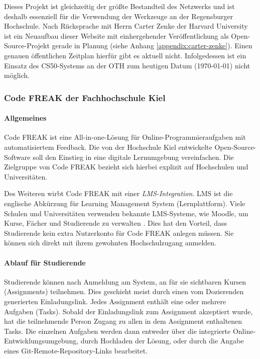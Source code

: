 Dieses Projekt ist gleichzeitig der größte Bestandteil des Netzwerks und ist
deshalb essenziell für die Verwendung der Werkzeuge an der Regensburger
Hochschule. Nach Rücksprache mit Herrn Carter Zenke der Harvard University ist
ein Neuaufbau dieser Website mit einhergehender Veröffentlichung als
Open-Source-Projekt gerade in Planung (siehe Anhang
\ref{appendix:carter-zenke}). Einen genauen öffentlichen Zeitplan hierfür gibt
es aktuell nicht. Infolgedessen ist ein Einsatz des CS50-Systems an der OTH zum
heutigen Datum (\today) nicht möglich.

\newpage
\subsubsection{Code FREAK der Fachhochschule Kiel}\label{code-freak}
\paragraph{Allgemeines}
Code FREAK ist eine All-in-one-Lösung für Online-Programmieraufgaben mit
automatisiertem Feedback. Die von der Hochschule Kiel entwickelte
Open-Source-Software soll den Einstieg in eine digitale Lernumgebung
vereinfachen. Die Zielgruppe von Code FREAK bezieht sich hierbei explizit auf
Hochschulen und Universitäten. \parencite{codefreak-startseite}

Des Weiteren wirbt Code FREAK mit einer \emph{LMS-Integration}. LMS ist die
englische Abkürzung für Learning Management System (Lernplattform). Viele
Schulen und Universitäten verwenden bekannte LMS-Systeme, wie Moodle, um Kurse,
Fächer und Studierende zu verwalten \parencite{moodle}. Dies hat den Vorteil,
dass Studierende kein extra Nutzerkonto für Code FREAK anlegen müssen. Sie
können sich direkt mit ihrem gewohnten Hochschulzugang anmelden.

\paragraph{Ablauf für Studierende}
Studierende können nach Anmeldung am System, an für sie sichtbaren Kursen
(Assignments) teilnehmen. Dies geschieht meist durch einen vom Dozierenden
generierten Einladungslink. Jedes Assignment enthält eine oder mehrere Aufgaben
(Tasks). Sobald der Einladungslink zum Assignment akzeptiert wurde, hat die
teilnehmende Person Zugang zu allen in dem Assignment enthaltenen Tasks. Die
einzelnen Aufgaben werden dann entweder über die integrierte
Online-Entwicklungsumgebung, durch Hochladen der Lösung, oder durch die Angabe
eines Git-Remote-Repository-Links bearbeitet.

